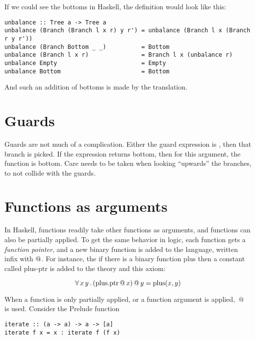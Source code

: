 If we could see the bottoms in Haskell, the definition would look like this:

\begin{verbatim}
unbalance :: Tree a -> Tree a
unbalance (Branch (Branch l x r) y r') = unbalance (Branch l x (Branch r y r'))
unbalance (Branch Bottom _ _)          = Bottom
unbalance (Branch l x r)               = Branch l x (unbalance r)
unbalance Empty                        = Empty
unbalance Bottom                       = Bottom
\end{verbatim}

And such an addition of bottoms is made by the translation.

\section{Guards}

Guards are not much of a complication. Either the guard expression is
, then that branch is picked. If the expression returns
bottom, then for this argument, the function is bottom. Care needs to
be taken when looking ``upwards'' the branches, to not collide with
the guards.

\section{Functions as arguments}

In Haskell, functions readily take other functions as arguments, and
functions can also be partially applied. To get the same behavior in
logic, each function gets a \emph{function pointer}, and a new binary
function is added to the language, written infix with $\mathrm{@}$.
For instance, the if there is a binary function plus then a constant
called plus-ptr is added to the theory and this axiom:

\begin{equation*}
\forall \, x \, y \, . \, (\mathrm{plus.ptr} \, @ \, x) \, @ \, y = \mathrm{plus}(x,y)
\end{equation*}

When a function is only partially applied, or a function argument is
applied, $\, @ \, $ is used. Consider the Prelude function 

\begin{verbatim}
iterate :: (a -> a) -> a -> [a]
iterate f x = x : iterate f (f x)
\end{verbatim}

